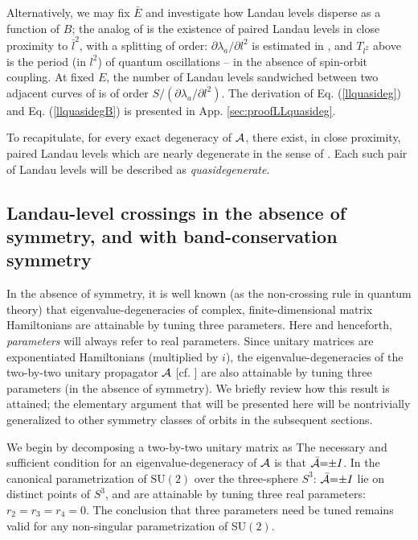 \documentclass[aps, showpacs, twocolumn, notitlepage, superscriptaddress]{revtex4-1}
\begin{document}
Alternatively, we may fix $\bar{E}$ and investigate how Landau levels disperse as a function of $B$; the analog of   is the existence of paired Landau levels in close proximity to $\bar{l}^2$, with a splitting of order:
$\partial \lambda_a/\partial l^2$ is estimated in , and
$T_{l^2}$ above is the period (in $l^2$) of quantum oscillations -- in the absence of spin-orbit coupling. At fixed $E$, the number of Landau levels sandwiched between two adjacent curves of  is of order $S/(\partial \lambda_a/\partial l^2).$ The derivation of Eq. (\ref{llquasideg}) and Eq. (\ref{llquasidegB}) is presented in App. \ref{sec:proofLLquasideg}.

To recapitulate, for every exact degeneracy of ${\cal A}$, there exist, in close proximity, paired Landau levels which are  nearly degenerate in the sense of . Each such pair of Landau levels will be described as \textit{quasidegenerate}. 

\subsection{Landau-level crossings in the absence of symmetry, and with band-conservation symmetry}\label{sec:introducecodimension}


In the absence of symmetry,  it is well known (as the non-crossing rule in quantum theory\cite{neumann2000behaviour}) that eigenvalue-degeneracies of complex, finite-dimensional matrix Hamiltonians are attainable by tuning three parameters. Here and henceforth,   \textit{parameters}  will always refer to real parameters. Since unitary matrices are exponentiated Hamiltonians (multiplied by $i$), the eigenvalue-degeneracies of the two-by-two unitary propagator ${\cal A}$ [cf. ] are also attainable by tuning three parameters (in the absence of symmetry)\cite{haake2010quantum}. We briefly review how this  result is attained; the elementary argument that will be presented here will be nontrivially generalized to other symmetry classes of orbits in the subsequent sections. 


We begin by decomposing a two-by-two unitary  matrix as  The necessary and sufficient condition for an eigenvalue-degeneracy of ${\cal A}$ is that ${\cal \bar{A}}{=}{\pm}I$. In the canonical parametrization of $\text{SU}(2)$ over the three-sphere $S^3$: 
${\cal \bar{A}}{=}{\pm}I$ lie on distinct points of $S^3$, and are attainable by tuning three real parameters: $r_2{=}r_3{=}r_4{=}0$. The conclusion that three parameters need be tuned remains valid for any  non-singular parametrization of SU$(2)$. 
\end{document}

